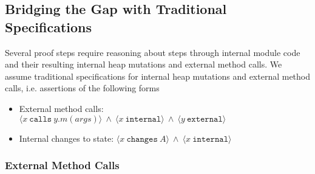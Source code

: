 \documentclass[12pt]{article}
\newcommand\hoare[3]{\{#1\}\ #2\ \{#3\}}
\newcommand\effect[3]{\{#1\}\ #2\ [#3]}
\newcommand\calls[4]{\langle #1\ \texttt{calls}\ #2.#3(#4) \rangle}
\newcommand\changes[2]{\langle #1\ \texttt{changes}\ #2 \rangle}
\newcommand\access[2]{\langle #1\ \texttt{access}\ #2 \rangle}
\newcommand\internal[1]{\langle #1\ \texttt{internal}\rangle}
\newcommand\external[1]{\langle #1\ \texttt{external}\rangle}
\numberwithin{case}{lemma}
\numberwithin{case}{theorem}
\numberwithin{subcase}{case}
\begin{document}
{\color{Blue}
\subsection{Bridging the Gap with Traditional Specifications}
	
Several proof steps require reasoning about steps 
through internal module code and their resulting internal heap mutations and external method calls. 
We assume traditional
specifications for 
internal heap mutations and external method calls, i.e. assertions of the following forms
\begin{itemize}
\item
External method calls:
$\calls{x}{y}{m}{args}\ \wedge\ \internal{x}\ \wedge\ \external{y}$
\item
Internal changes to state:
$\changes{x}{A}\ \wedge\ \internal{x}$
\end{itemize}

\subsubsection{External Method Calls}
\label{s:ext_meth}

}
\end{document}
